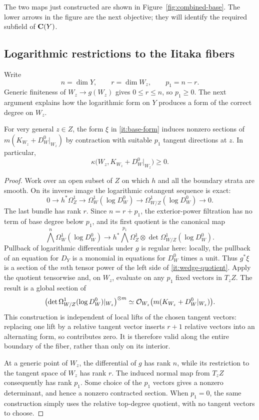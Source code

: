 The two maps just constructed are shown in
Figure~\ref{fig:combined-base}. The lower arrows in the figure are
the next objective; they will identify the required subfield of
$\mathbf C(Y)$.


\subsection{Logarithmic restrictions to the Iitaka fibers}

Write
\[
 n=\dim Y,\qquad r=\dim W_z,\qquad p_1=n-r.
\]
Generic finiteness of $W_z\to g(W_z)$ gives $0\leq r\leq n$, so
$p_1\geq0$.  The next argument explains how the logarithmic form on $Y$
produces a form of the correct degree on $W_z$.

\begin{lemma}\label{it:contraction}
For very general $z\in Z$, the form $\xi$ in \eqref{it:base-form} induces
nonzero sections of $m(K_{W_z}+D_W^0|_{W_z})$ by contraction with suitable
$p_1$ tangent directions at $z$.  In particular,
\[
 \kappa\bigl(W_z,K_{W_z}+D_W^0|_{W_z}\bigr)\geq0.
\]
\end{lemma}

\begin{proof}
Work over an open subset of $Z$ on which $h$ and all the boundary strata
are smooth.  On its inverse image the logarithmic cotangent sequence is
exact:
\[
 0\longrightarrow h^*\Omega_Z^1
 \longrightarrow\Omega_W^1(\log D_W^0)
 \longrightarrow\Omega_{W/Z}^1(\log D_W^0)
 \longrightarrow0.
\]
The last bundle has rank $r$.  Since $n=r+p_1$, the exterior-power
filtration has no term of base degree below $p_1$, and its first quotient
is the canonical map
\begin{equation}\label{it:wedge-quotient}
 \bigwedge^n\Omega_W^1(\log D_W^0)
 \longrightarrow
 h^*\!\bigwedge^{p_1}\Omega_Z^1
 \otimes\det\Omega_{W/Z}^1(\log D_W^0).
\end{equation}
Pullback of logarithmic differentials under $g$ is regular here: locally,
the pullback of an equation for $D_Y$ is a monomial in equations for
$D_W^0$ times a unit.  Thus $g^*\xi$ is a section of the $m$th tensor
power of the left side of \eqref{it:wedge-quotient}.  Apply the quotient
tensorwise and, on $W_z$, evaluate on any $p_1$ fixed vectors in $T_zZ$.
The result is a global section of
\[
 \bigl(\det\Omega_{W/Z}^1(\log D_W^0)|_{W_z}\bigr)^{\otimes m}
 \simeq\mathcal O_{W_z}\bigl(m(K_{W_z}+D_W^0|_{W_z})\bigr).
\]
This construction is independent of local lifts of the chosen tangent
vectors: replacing one lift by a relative tangent vector inserts $r+1$
relative vectors into an alternating form, so contributes zero.  It is
therefore valid along the entire boundary of the fiber, rather than
only on its interior.

At a generic point of $W_z$, the differential of $g$ has rank $n$, while
its restriction to the tangent space of $W_z$ has rank $r$.  The induced
normal map from $T_zZ$ consequently has rank $p_1$.  Some choice of the
$p_1$ vectors gives a nonzero determinant, and hence a nonzero contracted
section.  When $p_1=0$, the same construction simply uses the relative
top-degree quotient, with no tangent vectors to choose.
\end{proof}

